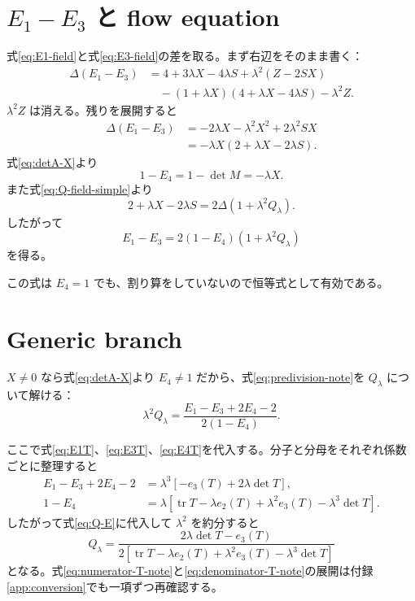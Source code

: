 \documentclass[a4paper,11pt]{ltjsreport}
\newcommand{\tr}{\operatorname{tr}}
\begin{document}
\section{\texorpdfstring{$E_1-E_3$ と flow equation}{E1-E3 と flow equation}}

式\eqref{eq:E1-field}と式\eqref{eq:E3-field}の差を取る。まず右辺をそのまま書く：
\begin{align}
 \Delta(E_1-E_3)
 &=4+3\lambda X-4\lambda S+\lambda^2(Z-2SX)\nonumber\\
 &\quad-(1+\lambda X)(4+\lambda X-4\lambda S)-\lambda^2Z.
\end{align}
$\lambda^2Z$ は消える。残りを展開すると
\begin{align}
 \Delta(E_1-E_3)
 &=-2\lambda X-\lambda^2X^2+2\lambda^2SX\\
 &=-\lambda X(2+\lambda X-2\lambda S).
 \label{eq:E1minusE3-field}
\end{align}
式\eqref{eq:detA-X}より
\begin{equation}
 1-E_4=1-\det M=-\lambda X.
\end{equation}
また式\eqref{eq:Q-field-simple}より
\begin{equation}
 2+\lambda X-2\lambda S=2\Delta(1+\lambda^2Q_\lambda).
\end{equation}
したがって
\begin{equation}
 E_1-E_3
 =2(1-E_4)(1+\lambda^2Q_\lambda)
 \label{eq:predivision-note}
\end{equation}
を得る。

この式は $E_4=1$ でも、割り算をしていないので恒等式として有効である。

\section{Generic branch}

$X\neq0$ なら式\eqref{eq:detA-X}より $E_4\neq1$ だから、式\eqref{eq:predivision-note}を $Q_\lambda$ について解ける：
\begin{equation}
 \lambda^2Q_\lambda
 =\frac{E_1-E_3+2E_4-2}{2(1-E_4)}.
 \label{eq:Q-E}
\end{equation}

ここで式\eqref{eq:E1T}、\eqref{eq:E3T}、\eqref{eq:E4T}を代入する。分子と分母をそれぞれ係数ごとに整理すると
\begin{align}
 E_1-E_3+2E_4-2
 &=\lambda^3\left[-e_3(T)+2\lambda\det T\right],
 \label{eq:numerator-T-note}\\
 1-E_4
 &=\lambda\left[\tr T-\lambda e_2(T)
 +\lambda^2e_3(T)-\lambda^3\det T\right].
 \label{eq:denominator-T-note}
\end{align}
したがって式\eqref{eq:Q-E}に代入して $\lambda^2$ を約分すると
\begin{equation}
 Q_\lambda
 =\frac{2\lambda\det T-e_3(T)}
 {2\left[\tr T-\lambda e_2(T)+\lambda^2e_3(T)-\lambda^3\det T\right]}
 \label{eq:main-flow-again}
\end{equation}
となる。式\eqref{eq:numerator-T-note}と\eqref{eq:denominator-T-note}の展開は付録\ref{app:conversion}でも一項ずつ再確認する。
\end{document}
